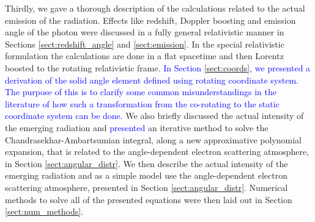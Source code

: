 \documentclass{aa}
\newcommand{\refe}[1]{\textcolor{blue}{{#1}}}
\newcommand{\refedel}[1]{}
\newcommand{\sch}{Schwarzschild }
\newcommand{\lgamma}{\gamma_{\text{L}}}
\begin{document}
Thirdly, we gave a thorough description of the calculations related to the actual emission of the radiation.
Effects like redshift, Doppler boosting and emission angle of the photon were discussed in a fully general relativistic manner in Sections \ref{sect:redshift_angle} and \ref{sect:emission}. 
\refedel{,hence also verifying the previous ad-hoc special relativistic formulations}%
In the special relativistic formulation \citep[see e.g.,][]{PB06} the calculations are done in a flat spacetime and then Lorentz boosted to the rotating relativistic frame.
\refe{In Section \ref{sect:coords}, we presented a derivation of the solid angle element defined using rotating coordinate system.}
\refe{The purpose of this is to clarify some common misunderstandings in the literature of how such a transformation from the co-rotating to the static coordinate system can be done.}
We also briefly discussed the actual intensity of the emerging radiation and \refe{presented} an iterative method to solve the Chandrasekhar-Ambartsumian integral, along a new approximative polynomial expansion, that is related to the angle-dependent electron scattering atmosphere, in Section \ref{sect:angular_distr}.
We then describe the actual intensity of the emerging radiation and as a simple model use the angle-dependent electron scattering atmosphere, presented in Section \ref{sect:angular_distr}.
Numerical methods to solve all of the presented equations were then laid out in Section \ref{sect:num_methods}.
\end{document}
